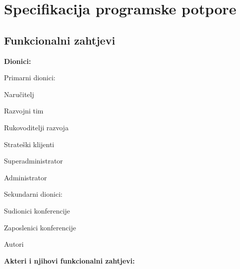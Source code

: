 \chapter{Specifikacija programske potpore}

	\section{Funkcionalni zahtjevi}


			\noindent \textbf{Dionici:}

			\begin{packed_enum}

				\item Primarni dionici:

				\begin{packed_enum}
					\item Naručitelj
					\item Razvojni tim
					\item Rukovoditelji razvoja
					\item Strateški klijenti
					\item Superadministrator
					\item Administrator
				\end{packed_enum}

				\item Sekundarni dionici:

				\begin{packed_enum}
					\item Sudionici konferencije
					\item Zaposlenici konferencije
					\item Autori
				\end{packed_enum}

			\end{packed_enum}

			\noindent \textbf{Akteri i njihovi funkcionalni zahtjevi:}


